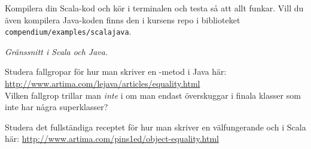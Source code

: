\Subtask Kompilera din Scala-kod och kör i terminalen och testa så att allt funkar. Vill du även kompilera Java-koden finns den i kursens repo i biblioteket \texttt{compendium/examples/scalajava}.  


\AdvancedTasks %

\TODO 
\Task \emph{Gränssnitt i Scala och Java.} 

\Task\Pen Studera fallgropar för hur man skriver en -metod i Java här:
\url{http://www.artima.com/lejava/articles/equality.html}\\
Vilken fallgrop trillar man \emph{inte} i om man endast överskuggar  i finala klasser som inte har några superklasser?

\Task\Pen Studera det fullständiga receptet för hur man skriver en välfungerande  och  i Scala här: \url{http://www.artima.com/pins1ed/object-equality.html} 


    